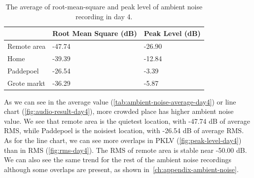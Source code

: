	\begin{table}[h]
	\centering
	\caption{The average of root-mean-square and peak level of ambient noise recording in day 4.}
	\label{tab:ambient-noise-average-day4}
	\begin{tabular}{lll}
	\toprule
	            & Root Mean Square (dB) & Peak Level (dB) \\ \midrule
	Remote area &  -47.74           &  -26.90          \\
	Home        &  -39.39         & -12.84          \\
	Paddepoel   & -26.54          &  -3.39        \\
	Grote markt & -36.29             & -5.87       \\ \bottomrule
	\end{tabular}
	\end{table}

	As we can see in the average value (\autoref{tab:ambient-noise-average-day4}) or line chart (\autoref{fig:audio-result-day4}), more crowded place has higher ambient noise value. We see that remote area is the quietest location, with -47.74 dB of average \ac{RMS}, while Paddepoel is the noisiest location, with -26.54 dB of average \ac{RMS}. As for the line chart, we can see more overlaps in \ac{PKLV} (\autoref{fig:peak-level-day4}) than in \ac{RMS} (\autoref{fig:rms-day4}). The \ac{RMS} of remote area is stable near -50.00 dB. We can also see the same trend for the rest of the ambient noise recordings although some overlaps are present, as shown in~\autoref{ch:appendix-ambient-noise}.
	


